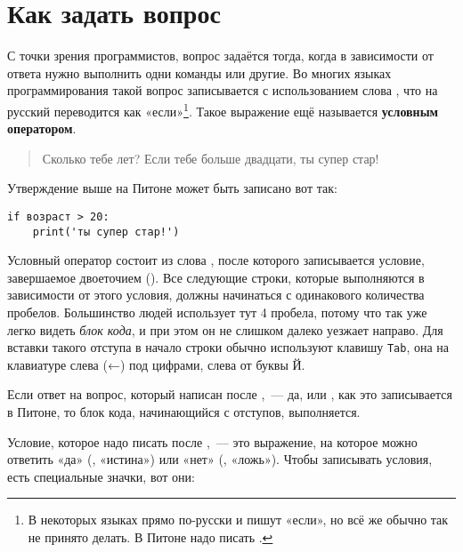 

\chapter{Как задать вопрос}\label{ch:howtoaskaquestion}

С точки зрения программистов, вопрос задаётся тогда, когда в зависимости от ответа нужно выполнить одни команды или другие. Во многих языках программирования такой вопрос записывается с использованием слова , что на русский переводится как «если»\footnote{В некоторых языках прямо по-русски и пишут «если», но всё же обычно так не принято делать. В Питоне надо писать .}. Такое выражение ещё называется \textbf{условным оператором}.

\begin{quotation}
Сколько тебе лет? Если тебе больше двадцати, ты супер стар!
\end{quotation}

Утверждение выше на Питоне может быть записано вот так:

\begin{listing}
\begin{verbatim}
if возраст > 20:
    print('ты супер стар!')
\end{verbatim}
\end{listing}

Условный оператор состоит из слова , после которого записывается условие, завершаемое двоеточием (\code{:}). Все следующие строки, которые выполняются в зависимости от этого условия, должны начинаться с одинакового количества пробелов. Большинство людей использует тут 4 пробела, потому что так уже легко видеть \textit{блок кода}, и при этом он не слишком далеко уезжает направо. Для вставки такого отступа в начало строки обычно используют клавишу \texttt{Tab}, она на клавиатуре слева (←) под цифрами, слева от буквы Й.

Если ответ на вопрос, который написан после , — да, или , как это записывается в Питоне, то блок кода, начинающийся с отступов, выполняется.

Условие, которое надо писать после , — это выражение, на которое можно ответить «да» (, «истина») или «нет» (, «ложь»). Чтобы записывать условия, есть специальные значки, вот они:

